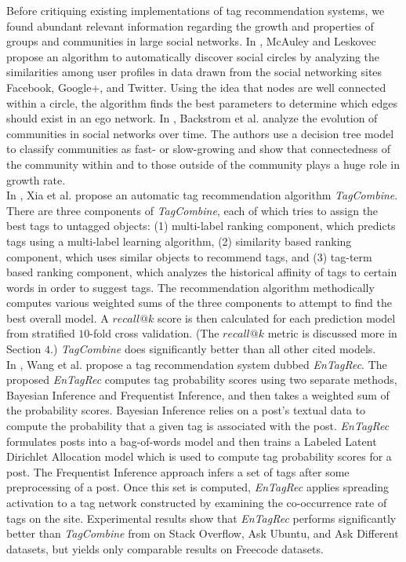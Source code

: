 \documentclass[10pt, final]{article}
\newcommand{\br}[1][.75]{\ \\[#1\baselineskip]}
\begin{document}
Before critiquing existing implementations of tag recommendation systems, we found abundant relevant information regarding the growth and properties of groups and communities in large social networks. In \cite{2}, McAuley and Leskovec propose an algorithm to automatically discover social circles by analyzing the similarities among user profiles in data drawn from the social networking sites Facebook, Google+, and Twitter. Using the idea that nodes are well connected within a circle, the algorithm finds the best parameters to determine which edges should exist in an ego network. In \cite{3}, Backstrom et al. analyze the evolution of communities in social networks over time. The authors use a decision tree model to classify communities as fast- or slow-growing and show that connectedness of the community within and to those outside of the community plays a huge role in growth rate.\br
In \cite{1}, Xia et al. propose an automatic tag recommendation algorithm \textit{TagCombine}. There are three components of \textit{TagCombine}, each of which tries to assign the best tags to untagged objects: (1) multi-label ranking component, which predicts tags using a multi-label learning algorithm, (2) similarity based ranking component, which uses similar objects to recommend tags, and (3) tag-term based ranking component, which analyzes the historical affinity of tags to certain words in order to suggest tags. The recommendation algorithm methodically computes various weighted sums of the three components to attempt to find the best overall model. A $recall@k$ score is then calculated for each prediction model from stratified $10$-fold cross validation. (The $recall@k$ metric is discussed more in Section $4$.) \textit{TagCombine} does significantly better than all other cited models.\br
In \cite{5}, Wang et al. propose a tag recommendation system dubbed \textit{EnTagRec}. The proposed \textit{EnTagRec} computes tag probability scores using two separate methods, Bayesian Inference and Frequentist Inference, and then takes a weighted sum of the probability scores. Bayesian Inference relies on a post's textual data to compute the probability that a given tag is associated with the post. \textit{EnTagRec} formulates posts into a bag-of-words model and then trains a Labeled Latent Dirichlet Allocation model which is used to compute tag probability scores for a post. The Frequentist Inference approach infers a set of tags after some preprocessing of a post. Once this set is computed, \textit{EnTagRec} applies spreading activation to a tag network constructed by examining the co-occurrence rate of tags on the site. Experimental results show that \textit{EnTagRec} performs significantly better than \textit{TagCombine} from \cite{1} on Stack Overflow, Ask Ubuntu, and Ask Different datasets, but yields only comparable results on Freecode datasets.\br
\end{document}
